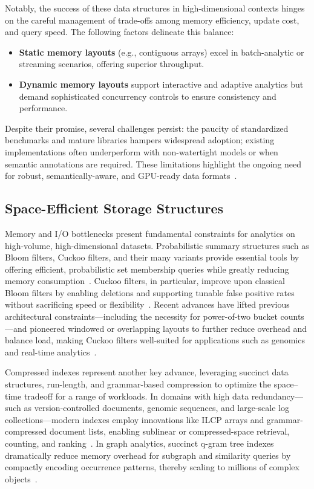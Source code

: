 Notably, the success of these data structures in high-dimensional contexts hinges on the careful management of trade-offs among memory efficiency, update cost, and query speed. The following factors delineate this balance:
\begin{itemize}
    \item \textbf{Static memory layouts} (e.g., contiguous arrays) excel in batch-analytic or streaming scenarios, offering superior throughput.
    \item \textbf{Dynamic memory layouts} support interactive and adaptive analytics but demand sophisticated concurrency controls to ensure consistency and performance.
\end{itemize}
Despite their promise, several challenges persist: the paucity of standardized benchmarks and mature libraries hampers widespread adoption; existing implementations often underperform with non-watertight models or when semantic annotations are required. These limitations highlight the ongoing need for robust, semantically-aware, and GPU-ready data formats~\cite{ref86}.

\subsection{Space-Efficient Storage Structures}

Memory and I/O bottlenecks present fundamental constraints for analytics on high-volume, high-dimensional datasets. Probabilistic summary structures such as Bloom filters, Cuckoo filters, and their many variants provide essential tools by offering efficient, probabilistic set membership queries while greatly reducing memory consumption~\cite{ref80,ref81,ref82,ref87,ref106,ref108,ref109,ref118}. Cuckoo filters, in particular, improve upon classical Bloom filters by enabling deletions and supporting tunable false positive rates without sacrificing speed or flexibility~\cite{ref81,ref82}. Recent advances have lifted previous architectural constraints—including the necessity for power-of-two bucket counts—and pioneered windowed or overlapping layouts to further reduce overhead and balance load, making Cuckoo filters well-suited for applications such as genomics and real-time analytics~\cite{ref81}.

\vspace{3mm}

Compressed indexes represent another key advance, leveraging succinct data structures, run-length, and grammar-based compression to optimize the space--time tradeoff for a range of workloads. In domains with high data redundancy—such as version-controlled documents, genomic sequences, and large-scale log collections—modern indexes employ innovations like ILCP arrays and grammar-compressed document lists, enabling sublinear or compressed-space retrieval, counting, and ranking~\cite{ref87,ref106,ref108}. In graph analytics, succinct q-gram tree indexes dramatically reduce memory overhead for subgraph and similarity queries by compactly encoding occurrence patterns, thereby scaling to millions of complex objects~\cite{ref109}.

